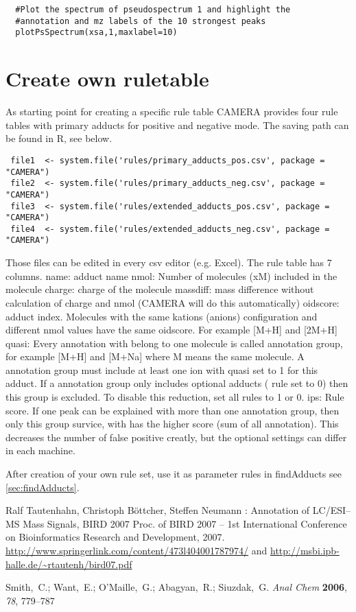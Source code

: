 \documentclass[a4paper,12pt]{article}
\begin{document}
\begin{verbatim}
  #Plot the spectrum of pseudospectrum 1 and highlight the
  #annotation and mz labels of the 10 strongest peaks
  plotPsSpectrum(xsa,1,maxlabel=10)
\end{verbatim}

\section{Create own ruletable}
\label{sec:ruletable}
As starting point for creating a specific rule table CAMERA provides four rule tables
with primary adducts for positive and negative mode. The saving path can be found 
in R, see below.
\begin{verbatim}
 file1  <- system.file('rules/primary_adducts_pos.csv', package = "CAMERA")
 file2  <- system.file('rules/primary_adducts_neg.csv', package = "CAMERA")
 file3  <- system.file('rules/extended_adducts_pos.csv', package = "CAMERA")
 file4  <- system.file('rules/extended_adducts_neg.csv', package = "CAMERA")
\end{verbatim}

Those files can be edited in every csv editor (e.g. Excel). The rule table has 7 columns.
name: adduct name
nmol: Number of molecules (xM) included in the molecule
charge: charge of the molecule
massdiff: mass difference without calculation of charge and nmol (CAMERA will do this automatically)
oidscore: adduct index. Molecules with the same kations (anions) configuration and different nmol values have the same oidscore. For example [M+H] and [2M+H]
quasi: Every annotation with belong to one molecule is called annotation group, for example [M+H] and [M+Na] where M means the same molecule. A annotation group
must include at least one ion with quasi set to 1 for this adduct. If a annotation group only includes optional adducts ( rule set to 0) then this group is excluded.
To disable this reduction, set all rules to 1 or 0.
ips: Rule score. If one peak can be explained with more than one annotation group, then only this group survice, with has the higher score (sum of all annotation).
This decreases the number of false positive creatly, but the optional settings can differ in each machine.

After creation of your own rule set, use it as parameter rules in findAdducts see \ref{sec:findAdducts}.

\begin{thebibliography}{t1}
 Ralf Tautenhahn, Christoph B\"ottcher, Steffen
  Neumann : Annotation of LC/ESI--MS Mass Signals, BIRD 2007 Proc. of
  BIRD 2007 -- 1st International Conference on Bioinformatics Research
  and Development, 2007.
  \url{http://www.springerlink.com/content/473l404001787974/}
  and \url{http://msbi.ipb-halle.de/~rtautenh/bird07.pdf}

Smith,~C.; Want,~E.; O'Maille,~G.; Abagyan,~R.; Siuzdak,~G. \emph{Anal Chem}
  \textbf{2006}, \emph{78}, 779--787\relax


\end{thebibliography}
\end{document}
